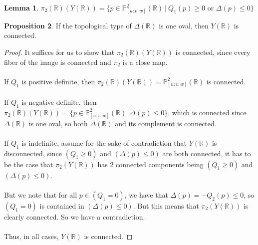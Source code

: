 \documentclass{article}
\newcommand{\Rbb}{\mathbb{R}}
\newcommand{\Pbb}{\mathbb{P}}
\begin{document}
\theoremstyle{definition}
\newtheorem{theorem}{Theorem}[section]
\theoremstyle{definition}
\newtheorem{conjecture}[theorem]{Conjecture}
\theoremstyle{definition}
\newtheorem{definition}[theorem]{Definition}
\theoremstyle{definition}
\newtheorem{goal}[theorem]{Goal}
\theoremstyle{definition}
\newtheorem{corollary}[theorem]{Corollary}
\theoremstyle{definition}
\newtheorem{question}[theorem]{Question}
\theoremstyle{definition}
\newtheorem{lemma}[theorem]{Lemma}
\theoremstyle{definition}
\newtheorem{proposition}[theorem]{Proposition}

\begin{lemma}
$\pi_2(\Rbb)(Y(\Rbb)) = \{p \in \Pbb^2_{[u:v:w]}(\Rbb)\ |\ Q_1(p) \geq 0 \text{ or } \Delta(p) \leq 0\}$
\end{lemma}

\begin{proposition}
If the topological type of $\Delta(\Rbb)$ is one oval, then $Y(\Rbb)$ is connected.
\end{proposition}

\begin{proof}
It suffices for us to show that $\pi_2(\Rbb)(Y(\Rbb))$ is connected, since every fiber of the image is connected and $\pi_2$ is a close map.\\\\
If $Q_1$ is positive definite, then $\pi_2(\Rbb)(Y(\Rbb)) = \Pbb^2_{[u:v:w]}(\Rbb)$ is connected.\\\\
If $Q_1$ is negative definite, then $\pi_2(\Rbb)(Y(\Rbb)) = \{p \in \Pbb^2_{[u:v:w]}(\Rbb)\ | \Delta(p) \leq 0\}$, which is connected since $\Delta(\Rbb)$ is one oval, so both $\Delta(\Rbb)$ and its complement is connected.\\\\
If $Q_1$ is indefinite, assume for the sake of contradiction that $Y(\Rbb)$ is disconnected, since $(Q_1 \geq 0)$ and $(\Delta(p) \leq 0)$ are both connected, it has to be the case that $\pi_2(Y(\Rbb))$ has 2 connected components being $(Q_1 \geq 0)$ and $(\Delta(p) \leq 0)$.\\\\
But we note that for all $p \in (Q_1 = 0)$, we have that $\Delta(p) = -Q_2(p) \leq 0$, so $(Q_1 = 0)$ is contained in $(\Delta(p) \leq 0)$. But this means that $\pi_2(Y(\Rbb))$ is clearly connected. So we have a contradiction.\\\\
Thus, in all cases, $Y(\Rbb)$ is connected.
\end{proof}
\end{document}
